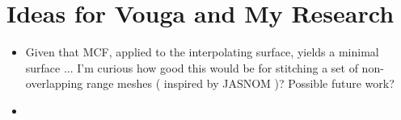 \documentclass{article}
\begin{document}
\section{Ideas for Vouga and My Research}
\begin{itemize}
	\item Given that MCF, applied to the interpolating surface, yields a minimal surface ... I'm curious how good this would be for stitching a set of non-overlapping range meshes ( inspired by JASNOM )? Possible future work? 
	\item 
\end{itemize}
\end{document}
